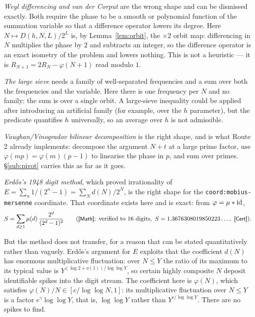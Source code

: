 \documentclass[11pt]{article}
\theoremstyle{plain}
\theoremstyle{definition}
\theoremstyle{remark}
\let\origmathrm\mathrm
\renewcommand{\mathrm}[1]{\ifmmode\origmathrm{#1}\else\textrm{#1}\fi}%
\newcommand{\ev}[1]{{\small\textsf{[#1]}}\xspace}
\newcommand{\coord}[1]{\texorpdfstring{{\small\nolinkurl{coord:#1}}}{coord:#1}\xspace}
\begin{document}
\emph{Weyl differencing and van der Corput} are the wrong shape and can be
dismissed exactly. Both require the phase to be a smooth or polynomial
function of the summation variable so that a difference operator lowers its
degree. Here $N\mapsto D(h,N,L)/2^{L}$ is, by Lemma~\ref{lem:orbit}, the
$\times 2$ orbit map: differencing in $N$ multiplies the phase by $2$ and
subtracts an integer, so the difference operator is an exact isometry of the
problem and lowers nothing. This is not a heuristic --- it is
$R_{N+1}=2R_N-\varphi(N+1)$ read modulo $1$.

\emph{The large sieve} needs a family of well-separated frequencies and a
sum over both the frequencies and the variable. Here there is one frequency
per $N$ and no family: the sum is over a single orbit. A large-sieve
inequality could be applied after introducing an artificial family (for
example, over the $h$ parameter), but the predicate quantifies $h$
universally, so an average over $h$ is not admissible.

\emph{Vaughan/Vinogradov bilinear decomposition} is the right shape, and is
what Route 2 already implements: decompose the argument $N+t$ at a large
prime factor, use $\varphi(mp)=\varphi(m)(p-1)$ to linearise the phase in
$p$, and sum over primes. \S\ref{sub:pivot} carries this as far as it goes.

\emph{Erd\H{o}s's 1948 digit method}, which proved irrationality of
$E=\sum_n 1/(2^n-1)=\sum_N d(N)/2^N$, is the right shape for the
\coord{mobius-mersenne} coordinate. That coordinate exists here and is
exact: from $\varphi=\mu * \mathrm{id}$,
\begin{equation}\label{eq:mobmers}
  S=\sum_{d\ge 1}\mu(d)\,\frac{2^{d}}{(2^{d}-1)^{2}}
  \qquad (\ev{Math};\ \text{verified to }16\ \text{digits},\ S=1.3676308019850223\ldots,\ \ev{Cert}).
\end{equation}

But the method does not transfer, for a reason that can be stated
quantitatively rather than vaguely. Erd\H{o}s's argument for $E$ exploits
that the coefficient $d(N)$ has enormous multiplicative fluctuation: over
$N\le Y$ the ratio of its maximum to its typical value is
$Y^{(\log 2+o(1))/\log\log Y}$, so certain highly composite $N$ deposit
identifiable spikes into the digit stream. The coefficient here is
$\varphi(N)$, which satisfies $\varphi(N)/N\in[c/\log\log N,1]$: its
multiplicative fluctuation over $N\le Y$ is a factor $e^{\gamma}\log\log Y$,
that is, $\log\log Y$ rather than $Y^{c/\log\log Y}$. There are no spikes to
find.
\end{document}

